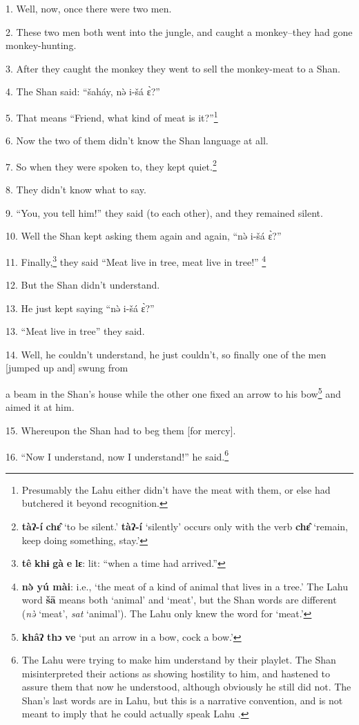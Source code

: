 \setcounter{footnote}{0}

1. Well, now, once there were two men.

2. These two men both went into the jungle, and caught a monkey--they had gone monkey-hunting.

3. After they caught the monkey they went to sell the monkey-meat to a Shan.

4. The Shan said: ``šaháy, nə̀ i-šá ɛ̀?''

5. That means ``Friend, what kind of meat is it?''\footnote{Presumably the Lahu either didn't have the meat with them, or else had butchered it beyond recognition.}

6. Now the two of them didn't know the Shan language at all.

7. So when they were spoken to, they kept quiet.\footnote{\textbf{tàʔ-í} \textbf{chɛ̂} `to be silent.' \textbf{tàʔ-í} `silently' occurs only with the verb \textbf{chɛ̂} `remain, keep doing something, stay.'}

8. They didn't know what to say.

9. ``You, you tell him!'' they said (to each other), and they remained
silent.

10. Well the Shan kept asking them again and again, ``nə̀ i-šá ɛ̀?''

11. Finally,\footnote{\textbf{tê} \textbf{khɨ} \textbf{gà} \textbf{e} \textbf{lɛ}: lit: ``when a time had arrived.''} they said ``Meat live in tree, meat live in tree!''
\footnote{\textbf{nə̀ yú mài}: i.e., `the meat of a kind of animal that lives in a tree.' The Lahu word \textbf{šā} means both `animal' and `meat', but the Shan words are different (\textit{nə̀} `meat', \textit{sat} `animal'). The Lahu only knew the word for `meat.'}

12. But the Shan didn't understand.

13. He just kept saying ``nə̀ i-šá ɛ̀?''

13. ``Meat live in tree'' they said.

14. Well, he couldn't understand, he just couldn't, so finally one of the men [jumped
up and] swung from

a beam in the Shan's house while the other one fixed an arrow to his bow\footnote{\textbf{khâʔ} \textbf{thɔ} \textbf{ve} `put an arrow in a bow, cock a bow.'} and
aimed it at him.

15. Whereupon the Shan had to beg them [for mercy].

16. ``Now I understand, now I understand!'' he said.\footnote{The Lahu were trying to make him understand by their playlet. The Shan misinterpreted their actions as showing hostility to him, and hastened to assure them that now he understood, although obviously he still did not. The Shan's last words are in Lahu, but this is a narrative convention, and is not meant to imply that he could actually speak Lahu .}

